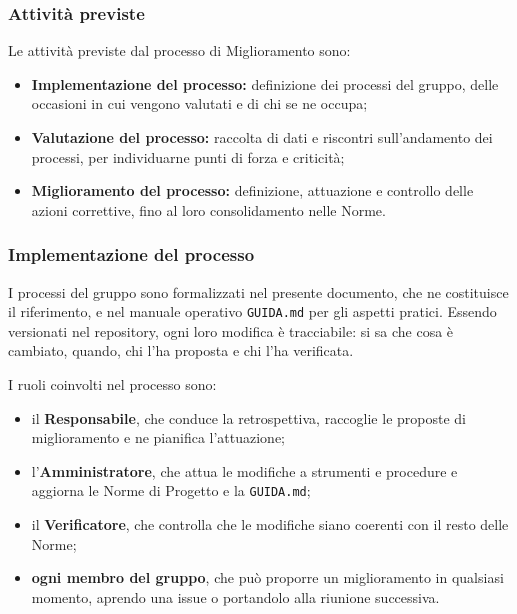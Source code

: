 \documentclass[documento]{gpt}
\begin{document}
	\subsubsection{Attività previste}
	Le attività previste dal processo di Miglioramento sono:
	\begin{itemize}
		\item \textbf{Implementazione del processo:} definizione dei processi del
		gruppo, delle occasioni in cui vengono valutati e di chi se ne
		occupa;
		\item \textbf{Valutazione del processo:} raccolta di dati e riscontri
		sull'andamento dei processi, per individuarne punti di forza e
		criticità;
		\item \textbf{Miglioramento del processo:} definizione, attuazione e
		controllo delle azioni correttive, fino al loro consolidamento nelle
		Norme.
	\end{itemize}
	
	\subsubsection{Implementazione del processo}
	I processi del gruppo sono formalizzati nel presente documento, che ne
	costituisce il riferimento, e nel manuale operativo \texttt{GUIDA.md} per gli
	aspetti pratici. Essendo versionati nel repository, ogni loro modifica è
	tracciabile: si sa che cosa è cambiato, quando, chi l'ha proposta e chi l'ha
	verificata.
	
	I ruoli coinvolti nel processo sono:
	\begin{itemize}
		\item il \textbf{Responsabile}, che conduce la retrospettiva, raccoglie le
		proposte di miglioramento e ne pianifica l'attuazione;
		\item l'\textbf{Amministratore}, che attua le modifiche a strumenti e
		procedure e aggiorna le Norme di Progetto e la \texttt{GUIDA.md};
		\item il \textbf{Verificatore}, che controlla che le modifiche siano
		coerenti con il resto delle Norme;
		\item \textbf{ogni membro del gruppo}, che può proporre un miglioramento in
		qualsiasi momento, aprendo una issue o portandolo alla riunione
		successiva.
	\end{itemize}
	
\end{document}
